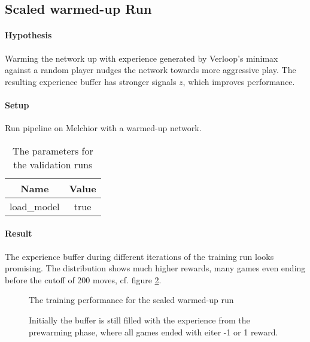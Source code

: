 \subsection{Scaled warmed-up Run}
\paragraph{Hypothesis} Warming the network up with experience generated by Verloop's minimax against a random player nudges the network towards more aggressive play. The resulting experience buffer has stronger signals $z$, which improves performance.

\paragraph{Setup} Run pipeline on Melchior with a warmed-up network.

\begin{table}[!h]
    \begin{center}
        \begin{tabular}{ c|c }
            Name        & Value \\
            \hline
            \hline
            load\_model & true  \\
        \end{tabular}
    \end{center}
    \caption{The parameters for the validation runs}
\end{table}

\paragraph{Result} The experience buffer during different iterations of the training run looks promising. The distribution shows much higher rewards, many games even ending before the cutoff of 200 moves, cf. figure \ref{performance_remote_warmed_up_exp_buffer}.

\begin{figure}[!h]
    \centering
    \hfill
    \caption{The training performance for the scaled warmed-up run}
    \label{performance_remote_warmed_up}
\end{figure}

\begin{figure}[!h]
    \centering
    \hfill
    \caption{Initially the buffer is still filled with the experience from the prewarming phase, where all games ended with eiter -1 or 1 reward.}
    \label{performance_remote_warmed_up_exp_buffer}
\end{figure}

